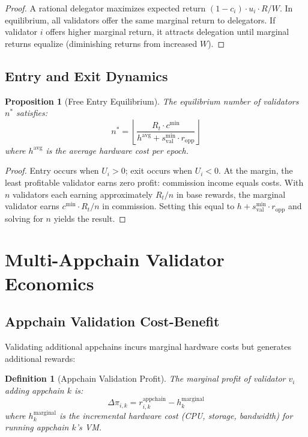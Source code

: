 \documentclass[11pt,a4paper]{article}
\newtheorem{proposition}[theorem]{Proposition}
\newtheorem{definition}{Definition}
\begin{document}
\begin{proof}
A rational delegator maximizes expected return $(1 - c_i) \cdot u_i \cdot R / W$. In equilibrium, all validators offer the same marginal return to delegators. If validator $i$ offers higher marginal return, it attracts delegation until marginal returns equalize (diminishing returns from increased $W$).
\end{proof}

\subsection{Entry and Exit Dynamics}

\begin{proposition}[Free Entry Equilibrium]
The equilibrium number of validators $n^*$ satisfies:
\begin{equation}
    n^* = \left\lfloor \frac{R_t \cdot c^{\min}}{h^{\text{avg}} + s^{\min}_{\text{val}} \cdot r_{\text{opp}}} \right\rfloor
\end{equation}
where $h^{\text{avg}}$ is the average hardware cost per epoch.
\end{proposition}

\begin{proof}
Entry occurs when $U_i > 0$; exit occurs when $U_i < 0$. At the margin, the least profitable validator earns zero profit: commission income equals costs. With $n$ validators each earning approximately $R_t / n$ in base rewards, the marginal validator earns $c^{\min} \cdot R_t / n$ in commission. Setting this equal to $h + s^{\min}_{\text{val}} \cdot r_{\text{opp}}$ and solving for $n$ yields the result.
\end{proof}

\section{Multi-Appchain Validator Economics}\label{sec:multiappchain}

\subsection{Appchain Validation Cost-Benefit}

Validating additional appchains incurs marginal hardware costs but generates additional rewards:

\begin{definition}[Appchain Validation Profit]
The marginal profit of validator $v_i$ adding appchain $k$ is:
\begin{equation}
    \Delta\pi_{i,k} = r_{i,k}^{\text{appchain}} - h_k^{\text{marginal}}
\end{equation}
where $h_k^{\text{marginal}}$ is the incremental hardware cost (CPU, storage, bandwidth) for running appchain $k$'s VM.
\end{definition}
\end{document}
